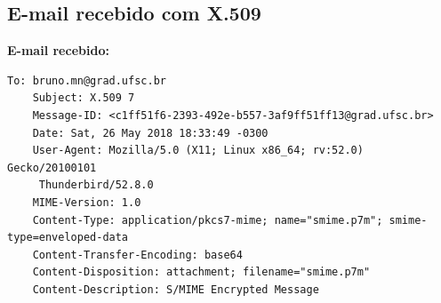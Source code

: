 \documentclass[
    article,            %
    11pt,               %
    oneside,            %
    a4paper,            %
    english,            %
    brazil,             %
    sumario=tradicional,
    ]{abntex2}
\begin{document}
\subsection{\textbf{E-mail recebido com X.509}}

\textbf{E-mail recebido:}
\begin{Verbatim}[frame=single, commandchars=\\\{\}, fontsize=\footnotesize]
    To: bruno.mn@grad.ufsc.br
    Subject: X.509 7
    Message-ID: <c1ff51f6-2393-492e-b557-3af9ff51ff13@grad.ufsc.br>
    Date: Sat, 26 May 2018 18:33:49 -0300
    User-Agent: Mozilla/5.0 (X11; Linux x86_64; rv:52.0) Gecko/20100101
     Thunderbird/52.8.0
    MIME-Version: 1.0
    Content-Type: application/pkcs7-mime; name="smime.p7m"; smime-type=enveloped-data
    Content-Transfer-Encoding: base64
    Content-Disposition: attachment; filename="smime.p7m"
    Content-Description: S/MIME Encrypted Message


\end{Verbatim}
\end{document}
